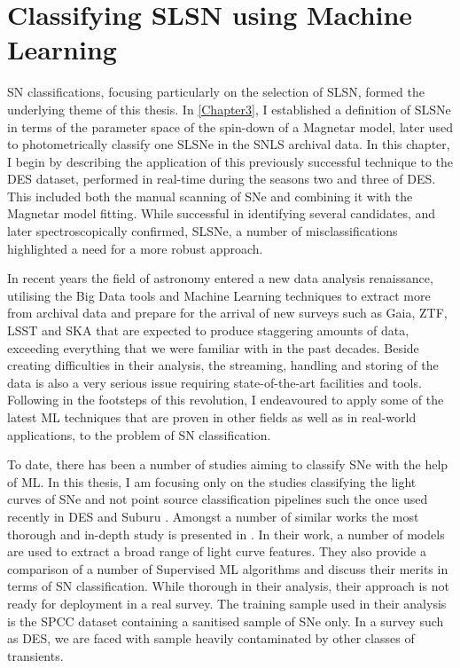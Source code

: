 \chapter{Classifying SLSN using Machine Learning}
\label{Chapter5}

SN classifications, focusing particularly on the selection of SLSN, formed the underlying theme of this thesis. In \cref{Chapter3}, I established a definition of SLSNe in terms of the parameter space of the spin-down of a Magnetar model, later used to photometrically classify one SLSNe in the SNLS archival data. In this chapter, I begin by describing the application of this previously successful technique to the DES dataset, performed in real-time during the seasons two and three of DES. This included both the manual scanning of SNe and combining it with the Magnetar model fitting. While successful in identifying several candidates, and later spectroscopically confirmed, SLSNe, a number of misclassifications highlighted a need for a more robust approach.

In recent years the field of astronomy entered a new data analysis renaissance, utilising the Big Data tools and Machine Learning techniques to extract more from archival data and prepare for the arrival of new surveys such as Gaia, ZTF, LSST and SKA that are expected to produce staggering amounts of data, exceeding everything that we were familiar with in the past decades. Beside creating difficulties in their analysis, the streaming, handling and storing of the data is also a very serious issue requiring state-of-the-art facilities and tools. Following in the footsteps of this revolution, I endeavoured to apply some of the latest ML techniques that are proven in other fields as well as in real-world applications, to the problem of SN classification.

To date, there has been a number of studies aiming to classify SNe with the help of ML. In this thesis, I am focusing only on the studies classifying the light curves of SNe and not point source classification pipelines such the once used recently in DES \citep{Goldstein2015} and Suburu \citep{Morii2016}. Amongst a number of similar works \citep{Karpenka2012,Moller2016,Charnock2016} the most thorough and in-depth study is presented in \citet{Lochner2016}. In their work, a number of models are used to extract a broad range of light curve features. They also provide a comparison of a number of Supervised ML algorithms and discuss their merits in terms of SN classification. While thorough in their analysis, their approach is not ready for deployment in a real survey. The training sample used in their analysis is the SPCC dataset containing a sanitised sample of SNe only. In a survey such as DES, we are faced with sample heavily contaminated by other classes of transients.

